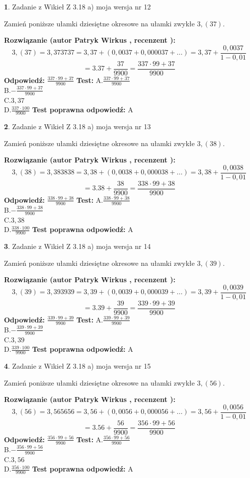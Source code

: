 \documentclass[12pt, a4paper]{article}
\theoremstyle{definition} %
\newtheorem{zad}{}
\newcommand{\zadStart}[1]{\begin{zad}#1\newline}
\newcommand{\zadStop}{\end{zad}}
\newcommand{\rozwStart}[2]{\noindent \textbf{Rozwiązanie (autor #1 , recenzent #2): }\newline}
\newcommand{\rozwStop}{\newline}
\newcommand{\odpStart}{\noindent \textbf{Odpowiedź:}\newline}
\newcommand{\odpStop}{\newline}
\newcommand{\testStart}{\noindent \textbf{Test:}\newline}
\newcommand{\testStop}{\newline}
\newcommand{\kluczStart}{\noindent \textbf{Test poprawna odpowiedź:}\newline}
\newcommand{\kluczStop}{\newline}
\begin{document}
\zadStart{Zadanie z Wikieł Z 3.18 a) moja wersja nr 12}

Zamień poniższe ułamki dziesiętne okresowe na ułamki zwykłe $3,(37)$.
\zadStop
\rozwStart{Patryk Wirkus}{}
$$3,(37)=3,373737=3,37+(0,0037+0,000037+...)=3,37+\frac{0,0037}{1-0,01}$$
$$=3.37+\frac{37}{9900}=\frac{337\cdot99+37}{9900}$$
\rozwStop
\odpStart
$\frac{337\cdot99+37}{9900}$
\odpStop
\testStart
A.$\frac{337\cdot99+37}{9900}$\\ B.$-\frac{337\cdot99+37}{9900}$\\ C.$3,37$\\ D.$\frac{337\cdot100}{9900}$
\testStop
\kluczStart
A
\kluczStop



\zadStart{Zadanie z Wikieł Z 3.18 a) moja wersja nr 13}

Zamień poniższe ułamki dziesiętne okresowe na ułamki zwykłe $3,(38)$.
\zadStop
\rozwStart{Patryk Wirkus}{}
$$3,(38)=3,383838=3,38+(0,0038+0,000038+...)=3,38+\frac{0,0038}{1-0,01}$$
$$=3.38+\frac{38}{9900}=\frac{338\cdot99+38}{9900}$$
\rozwStop
\odpStart
$\frac{338\cdot99+38}{9900}$
\odpStop
\testStart
A.$\frac{338\cdot99+38}{9900}$\\ B.$-\frac{338\cdot99+38}{9900}$\\ C.$3,38$\\ D.$\frac{338\cdot100}{9900}$
\testStop
\kluczStart
A
\kluczStop



\zadStart{Zadanie z Wikieł Z 3.18 a) moja wersja nr 14}

Zamień poniższe ułamki dziesiętne okresowe na ułamki zwykłe $3,(39)$.
\zadStop
\rozwStart{Patryk Wirkus}{}
$$3,(39)=3,393939=3,39+(0,0039+0,000039+...)=3,39+\frac{0,0039}{1-0,01}$$
$$=3.39+\frac{39}{9900}=\frac{339\cdot99+39}{9900}$$
\rozwStop
\odpStart
$\frac{339\cdot99+39}{9900}$
\odpStop
\testStart
A.$\frac{339\cdot99+39}{9900}$\\ B.$-\frac{339\cdot99+39}{9900}$\\ C.$3,39$\\ D.$\frac{339\cdot100}{9900}$
\testStop
\kluczStart
A
\kluczStop



\zadStart{Zadanie z Wikieł Z 3.18 a) moja wersja nr 15}

Zamień poniższe ułamki dziesiętne okresowe na ułamki zwykłe $3,(56)$.
\zadStop
\rozwStart{Patryk Wirkus}{}
$$3,(56)=3,565656=3,56+(0,0056+0,000056+...)=3,56+\frac{0,0056}{1-0,01}$$
$$=3.56+\frac{56}{9900}=\frac{356\cdot99+56}{9900}$$
\rozwStop
\odpStart
$\frac{356\cdot99+56}{9900}$
\odpStop
\testStart
A.$\frac{356\cdot99+56}{9900}$\\ B.$-\frac{356\cdot99+56}{9900}$\\ C.$3,56$\\ D.$\frac{356\cdot100}{9900}$
\testStop
\kluczStart
A
\kluczStop
\end{document}
